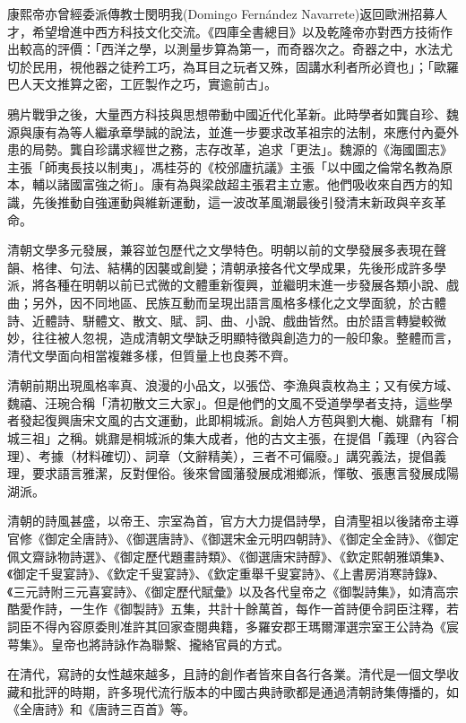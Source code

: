 康熙帝亦曾經委派傳教士閔明我(Domingo Fernández Navarrete)返回歐洲招募人才，希望增進中西方科技文化交流。《四庫全書總目》以及乾隆帝亦對西方技術作出較高的評價：「西洋之學，以測量步算為第一，而奇器次之。奇器之中，水法尤切於民用，視他器之徒矜工巧，為耳目之玩者又殊，固講水利者所必資也」；「歐羅巴人天文推算之密，工匠製作之巧，實逾前古」。

鴉片戰爭之後，大量西方科技與思想帶動中國近代化革新。此時學者如龔自珍、魏源與康有為等人繼承章學誠的說法，並進一步要求改革祖宗的法制，來應付內憂外患的局勢。龔自珍講求經世之務，志存改革，追求「更法」。魏源的《海國圖志》主張「師夷長技以制夷」，馮桂芬的《校邠廬抗議》主張「以中國之倫常名教為原本，輔以諸國富強之術」。康有為與梁啟超主張君主立憲。他們吸收來自西方的知識，先後推動自強運動與維新運動，這一波改革風潮最後引發清末新政與辛亥革命。

清朝文學多元發展，兼容並包歷代之文學特色。明朝以前的文學發展多表現在聲韻、格律、句法、結構的因襲或創變；清朝承接各代文學成果，先後形成許多學派，將各種在明朝以前已式微的文體重新復興，並繼明末進一步發展各類小說、戲曲；另外，因不同地區、民族互動而呈現出語言風格多樣化之文學面貌，於古體詩、近體詩、駢體文、散文、賦、詞、曲、小說、戲曲皆然。由於語言轉變較微妙，往往被人忽視，造成清朝文學缺乏明顯特徵與創造力的一般印象。整體而言，清代文學面向相當複雜多樣，但質量上也良莠不齊。

清朝前期出現風格率真、浪漫的小品文，以張岱、李漁與袁枚為主；又有侯方域、魏禧、汪琬合稱「清初散文三大家」。但是他們的文風不受道學學者支持，這些學者發起復興唐宋文風的古文運動，此即桐城派。創始人方苞與劉大櫆、姚鼐有「桐城三祖」之稱。姚鼐是桐城派的集大成者，他的古文主張，在提倡「義理（內容合理）、考據（材料確切）、詞章（文辭精美），三者不可偏廢。」講究義法，提倡義理，要求語言雅潔，反對俚俗。後來曾國藩發展成湘鄉派，惲敬、張惠言發展成陽湖派。

清朝的詩風甚盛，以帝王、宗室為首，官方大力提倡詩學，自清聖祖以後諸帝主導官修《御定全唐詩》、《御選唐詩》、《御選宋金元明四朝詩》、《御定全金詩》、《御定佩文齋詠物詩選》、《御定歷代題畫詩類》、《御選唐宋詩醇》、《欽定熙朝雅頌集》、《御定千叟宴詩》、《欽定千叟宴詩》、《欽定重舉千叟宴詩》、《上書房消寒詩錄》、《三元詩附三元喜宴詩》、《御定歷代賦彙》以及各代皇帝之《御製詩集》，如清高宗酷愛作詩，一生作《御製詩》五集，共計十餘萬首，每作一首詩便令詞臣注釋，若詞臣不得內容原委則准許其回家查閱典籍，多羅安郡王瑪爾渾選宗室王公詩為《宸萼集》。皇帝也將詩詠作為聯繫、攏絡官員的方式。

在清代，寫詩的女性越來越多，且詩的創作者皆來自各行各業。清代是一個文學收藏和批評的時期，許多現代流行版本的中國古典詩歌都是通過清朝詩集傳播的，如《全唐詩》和《唐詩三百首》等。

